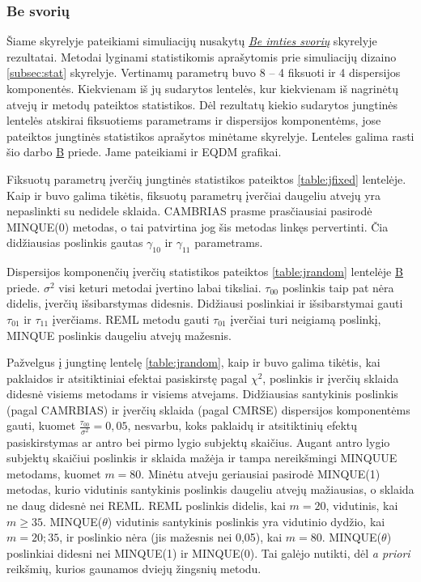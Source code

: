 \documentclass[11pt,a4paper]{article}
\begin{document}
\subsubsection*{Be svorių}
\indent Šiame skyrelyje pateikiami simuliacijų nusakytų \hyperlink{:besvoriu}{\textit{Be imties svorių}} skyrelyje rezultatai. Metodai lyginami statistikomis aprašytomis prie simuliacijų dizaino \ref{subsec:stat} skyrelyje. Vertinamų parametrų buvo 8 -- 4 fiksuoti ir 4 dispersijos komponentės. Kiekvienam iš jų sudarytos lentelės, kur kiekvienam iš nagrinėtų atvejų ir metodų pateiktos statistikos. Dėl rezultatų kiekio sudarytos jungtinės lentelės atskirai fiksuotiems parametrams ir dispersijos komponentėms, jose pateiktos jungtinės statistikos aprašytos minėtame skyrelyje. Lenteles galima rasti šio darbo \hyperlink{appendixb}{B} priede. Jame pateikiami ir EQDM grafikai.

\indent Fiksuotų parametrų įverčių jungtinės statistikos pateiktos \ref{table:jfixed} lentelėje. Kaip ir buvo galima tikėtis, fiksuotų parametrų įverčiai daugeliu atvejų yra nepaslinkti su nedidele sklaida. CAMBRIAS prasme prasčiausiai pasirodė MINQUE(0) metodas, o tai patvirtina jog šis metodas linkęs pervertinti. Čia didžiausias poslinkis gautas $\gamma_{10}$ ir $\gamma_{11}$ parametrams.

\indent Dispersijos komponenčių įverčių statistikos pateiktos \ref{table:jrandom} lentelėje \hyperlink{appendixb}{B} priede. $\sigma^2$ visi keturi metodai įvertino labai tiksliai. $\tau_{00}$ poslinkis taip pat nėra didelis, įverčių išsibarstymas didesnis. Didžiausi poslinkiai ir išsibarstymai gauti $\tau_{01}$ ir $\tau_{11}$ įverčiams. REML metodu gauti $\tau_{01}$ įverčiai turi neigiamą poslinkį, MINQUE poslinkis daugeliu atvejų mažesnis.

\indent Pažvelgus į jungtinę lentelę \ref{table:jrandom}, kaip ir buvo galima tikėtis, kai paklaidos ir atsitiktiniai efektai pasiskirstę pagal $\chi^2$, poslinkis ir įverčių sklaida didesnė visiems metodams ir visiems atvejams. Didžiausias santykinis poslinkis (pagal CAMRBIAS) ir įverčių sklaida (pagal CMRSE) dispersijos komponentėms gauti, kuomet $\frac{\tau_{00}}{\sigma^2}=0,05$, nesvarbu, koks paklaidų ir atsitiktinių efektų pasiskirstymas ar antro bei pirmo lygio subjektų skaičius. Augant antro lygio subjektų skaičiui poslinkis ir sklaida mažėja ir tampa nereikšmingi MINQUUE metodams, kuomet $m=80$. Minėtu atveju geriausiai pasirodė MINQUE(1) metodas, kurio vidutinis santykinis poslinkis daugeliu atvejų mažiausias, o sklaida ne daug didesnė nei REML. REML poslinkis didelis, kai $m=20$, vidutinis, kai $m\geq35$. MINQUE($\theta$) vidutinis santykinis poslinkis yra vidutinio dydžio, kai $m=20;35$, ir poslinkio nėra (jis mažesnis nei 0,05), kai $m=80$. MINQUE($\theta$) poslinkiai didesni nei MINQUE(1) ir MINQUE(0). Tai galėjo nutikti, dėl \textit{a priori} reikšmių, kurios gaunamos dviejų žingsnių metodu.
\end{document}
